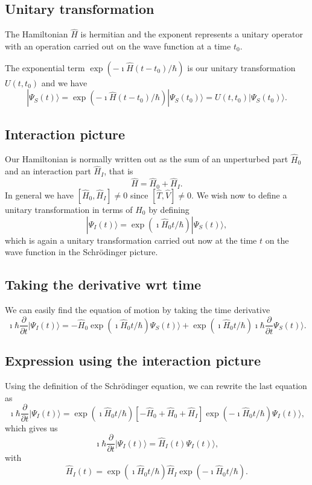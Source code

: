 \documentclass[%
oneside,                 %
final,                   %
10pt]{article}
\begin{document}
\subsection{Unitary transformation}

The Hamiltonian $\hat{H}$ is hermitian and the exponent represents a unitary 
operator with an operation carried out on the wave function at a time $t_0$.

The exponential term $\exp{(-\imath\hat{H}(t-t_0)/\hbar)}$ is our
unitary transformation $U(t,t_0)$ and we have
\[
|\Psi_S(t)\rangle = \exp{(-\imath\hat{H}(t-t_0)/\hbar)}|\Psi_S(t_0)\rangle=U(t,t_0)|\Psi_S(t_0)\rangle.
\]

\subsection{Interaction picture}

Our Hamiltonian is normally written out as the sum of an unperturbed part $\hat{H}_0$ and an interaction part $\hat{H}_I$, that is
\[
\hat{H}=\hat{H}_0+\hat{H}_I.
\]
In general we have $[\hat{H}_0,\hat{H}_I]\ne 0$ since $[\hat{T},\hat{V}]\ne 0$.
We wish now to define a unitary transformation in terms of $\hat{H}_0$ by defining
\[
|\Psi_I(t)\rangle = \exp{(\imath\hat{H}_0t/\hbar)}|\Psi_S(t)\rangle,
\]
which is again a unitary transformation carried out now at the time $t$ on the 
wave function in the Schrödinger picture. 

\subsection{Taking the derivative wrt time}

We can easily find the equation of motion by taking the time derivative
\[
\imath \hbar\frac{\partial }{\partial t}|\Psi_I(t)\rangle = -\hat{H}_0\exp{(\imath\hat{H}_0t/\hbar)}\Psi_S(t)\rangle+\exp{(\imath\hat{H}_0t/\hbar)}
\imath \hbar\frac{\partial }{\partial t}\Psi_S(t)\rangle.
\]
\subsection{Expression using the interaction picture}

Using the definition of the Schrödinger equation, we can rewrite the last equation as 
\[
\imath \hbar\frac{\partial }{\partial t}|\Psi_I(t)\rangle = \exp{(\imath\hat{H}_0t/\hbar)}\left[-\hat{H}_0+\hat{H}_0+\hat{H}_I\right]\exp{(-\imath\hat{H}_0t/\hbar)}\Psi_I(t)\rangle,
\]
which gives us
\[
\imath \hbar\frac{\partial }{\partial t}|\Psi_I(t)\rangle = \hat{H}_I(t)\Psi_I(t)\rangle,
\]
 with 
\[
\hat{H}_I(t)=
\exp{(\imath\hat{H}_0t/\hbar)}\hat{H}_I\exp{(-\imath\hat{H}_0t/\hbar)}.
\]
\end{document}
